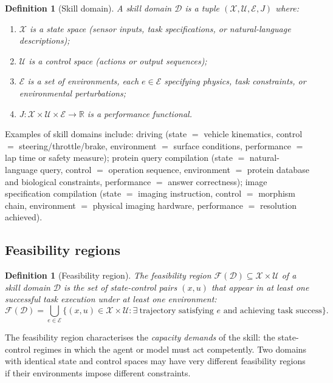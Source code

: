 \documentclass[twocolumn,11pt,a4paper]{article}
\newtheorem{definition}[theorem]{Definition}
\newcommand{\cD}{\mathcal{D}}
\newcommand{\cF}{\mathcal{F}}
\newcommand{\cU}{\mathcal{U}}
\newcommand{\cX}{\mathcal{X}}
\newcommand{\cE}{\mathcal{E}}
\newcommand{\R}{\mathbb{R}}
\begin{document}
\begin{definition}[Skill domain]
\label{def:skill-domain}
A \emph{skill domain} $\cD$ is a tuple $(\cX, \cU, \cE, J)$ where:
\begin{enumerate}[leftmargin=*,itemsep=1pt]
\item $\cX$ is a state space (sensor inputs, task specifications, or natural-language descriptions);
\item $\cU$ is a control space (actions or output sequences);
\item $\cE$ is a set of environments, each $e \in \cE$ specifying physics, task constraints, or environmental perturbations;
\item $J: \cX \times \cU \times \cE \to \R$ is a performance functional.
\end{enumerate}
\end{definition}

Examples of skill domains include: driving (state $= $ vehicle kinematics, control $=$ steering/throttle/brake, environment $=$ surface conditions, performance $=$ lap time or safety measure); protein query compilation (state $=$ natural-language query, control $=$ operation sequence, environment $=$ protein database and biological constraints, performance $=$ answer correctness); image specification compilation (state $=$ imaging instruction, control $=$ morphism chain, environment $=$ physical imaging hardware, performance $=$ resolution achieved).

\subsection{Feasibility regions}

\begin{definition}[Feasibility region]
\label{def:feasibility-region}
The \emph{feasibility region} $\cF(\cD) \subseteq \cX \times \cU$ of a skill domain $\cD$ is the set of state-control pairs $(x, u)$ that appear in at least one successful task execution under at least one environment:
\begin{equation}
\cF(\cD) = \bigcup_{e \in \cE}\bigl\{ (x, u) \in \cX \times \cU : \exists\ \text{trajectory satisfying $e$ and achieving task success} \bigr\}.
\end{equation}
\end{definition}

The feasibility region characterises the \emph{capacity demands} of the skill: the state-control regimes in which the agent or model must act competently. Two domains with identical state and control spaces may have very different feasibility regions if their environments impose different constraints.
\end{document}
